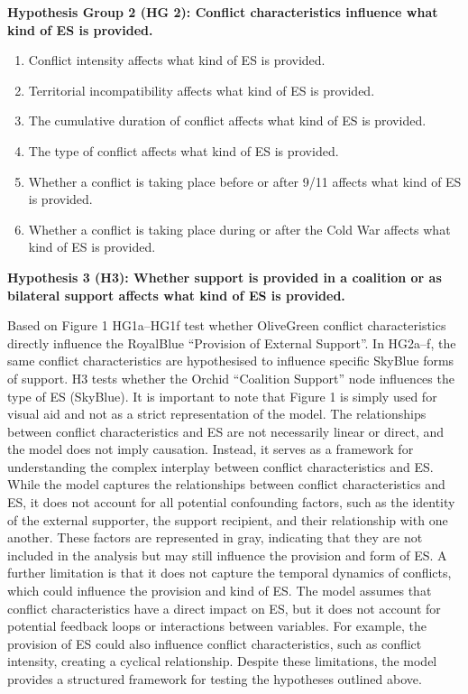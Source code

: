 \documentclass[
]{article}
\begin{document}
\textbf{Hypothesis Group 2 (HG 2): Conflict characteristics influence
what kind of ES is provided.}

\begin{enumerate}
\def\labelenumi{\alph{enumi})}
\item
  Conflict intensity affects what kind of ES is provided.
\item
  Territorial incompatibility affects what kind of ES is provided.
\item
  The cumulative duration of conflict affects what kind of ES is
  provided.
\item
  The type of conflict affects what kind of ES is provided.
\item
  Whether a conflict is taking place before or after 9/11 affects what
  kind of ES is provided.
\item
  Whether a conflict is taking place during or after the Cold War
  affects what kind of ES is provided.
\end{enumerate}

\textbf{Hypothesis 3 (H3): Whether support is provided in a coalition or
as bilateral support affects what kind of ES is provided.}

Based on Figure 1 HG1a--HG1f test whether OliveGreen conflict
characteristics directly influence the RoyalBlue ``Provision of External
Support''. In HG2a--f, the same conflict characteristics are
hypothesised to influence specific SkyBlue forms of support. H3 tests
whether the Orchid ``Coalition Support'' node influences the type of ES
(SkyBlue). It is important to note that Figure 1 is simply used for
visual aid and not as a strict representation of the model. The
relationships between conflict characteristics and ES are not
necessarily linear or direct, and the model does not imply causation.
Instead, it serves as a framework for understanding the complex
interplay between conflict characteristics and ES. While the model
captures the relationships between conflict characteristics and ES, it
does not account for all potential confounding factors, such as the
identity of the external supporter, the support recipient, and their
relationship with one another. These factors are represented in gray,
indicating that they are not included in the analysis but may still
influence the provision and form of ES. A further limitation is that it
does not capture the temporal dynamics of conflicts, which could
influence the provision and kind of ES. The model assumes that conflict
characteristics have a direct impact on ES, but it does not account for
potential feedback loops or interactions between variables. For example,
the provision of ES could also influence conflict characteristics, such
as conflict intensity, creating a cyclical relationship. Despite these
limitations, the model provides a structured framework for testing the
hypotheses outlined above.
\end{document}
